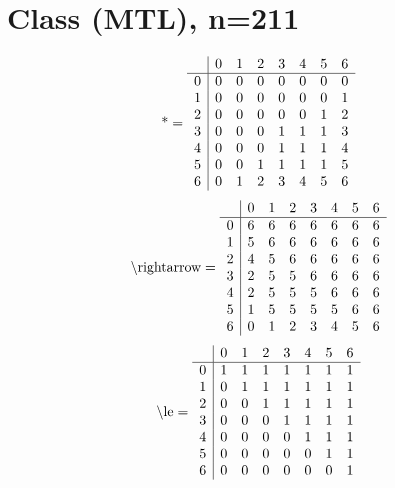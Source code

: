 \documentclass[11pt]{article}
\begin{document}
\section{Class (MTL), n=211}
\[\text{*} = 
\begin{array}{r | r r r r r r r}
 & 0 & 1 & 2 & 3 & 4 & 5 & 6 \\ \hline
0 & 0 & 0 & 0 & 0 & 0 & 0 & 0 \\
1 & 0 & 0 & 0 & 0 & 0 & 0 & 1 \\
2 & 0 & 0 & 0 & 0 & 0 & 1 & 2 \\
3 & 0 & 0 & 0 & 1 & 1 & 1 & 3 \\
4 & 0 & 0 & 0 & 1 & 1 & 1 & 4 \\
5 & 0 & 0 & 1 & 1 & 1 & 1 & 5 \\
6 & 0 & 1 & 2 & 3 & 4 & 5 & 6 \\
\end{array}
\]
\[\text{\textbackslash rightarrow} = 
\begin{array}{r | r r r r r r r}
 & 0 & 1 & 2 & 3 & 4 & 5 & 6 \\ \hline
0 & 6 & 6 & 6 & 6 & 6 & 6 & 6 \\
1 & 5 & 6 & 6 & 6 & 6 & 6 & 6 \\
2 & 4 & 5 & 6 & 6 & 6 & 6 & 6 \\
3 & 2 & 5 & 5 & 6 & 6 & 6 & 6 \\
4 & 2 & 5 & 5 & 5 & 6 & 6 & 6 \\
5 & 1 & 5 & 5 & 5 & 5 & 6 & 6 \\
6 & 0 & 1 & 2 & 3 & 4 & 5 & 6 \\
\end{array}
\]
\[\text{\textbackslash le} = 
\begin{array}{r | r r r r r r r}
 & 0 & 1 & 2 & 3 & 4 & 5 & 6 \\ \hline
0 & 1 & 1 & 1 & 1 & 1 & 1 & 1 \\
1 & 0 & 1 & 1 & 1 & 1 & 1 & 1 \\
2 & 0 & 0 & 1 & 1 & 1 & 1 & 1 \\
3 & 0 & 0 & 0 & 1 & 1 & 1 & 1 \\
4 & 0 & 0 & 0 & 0 & 1 & 1 & 1 \\
5 & 0 & 0 & 0 & 0 & 0 & 1 & 1 \\
6 & 0 & 0 & 0 & 0 & 0 & 0 & 1 \\
\end{array}
\]
\end{document}
